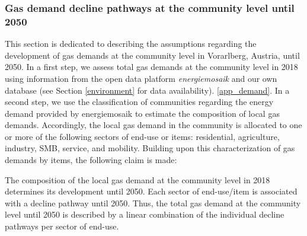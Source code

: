  \subsubsection{Gas demand decline pathways at the community level until 2050}
This section is dedicated to describing the assumptions regarding the development of gas demands at the community level in Vorarlberg, Austria, until 2050. In a first step, we assess total gas demands at the community level in 2018 using information from the open data platform \textit{energiemosaik} \cite{energiemosaik} and our own database (see Section \ref{environment} for data availability).  \ref{app_demand}. In a second step, we use the classification of communities regarding the energy demand provided by energiemosaik to estimate the composition of local gas demands. Accordingly, the local gas demand in the community is allocated to one or more of the following sectors of end-use or items: residential, agriculture, industry, SMB, service, and mobility. Building upon this characterization of gas demands by items, the following claim is made: 

\begin{addmargin}[0.75cm]{0pt}
	The composition of the local gas demand at the community level in 2018 determines its development until 2050. Each sector of end-use/item is associated with a decline pathway until 2050. Thus, the total gas demand at the community level until 2050 is described by a linear combination of the individual decline pathways per sector of end-use.
\end{addmargin}
\vspace{0.35cm}

